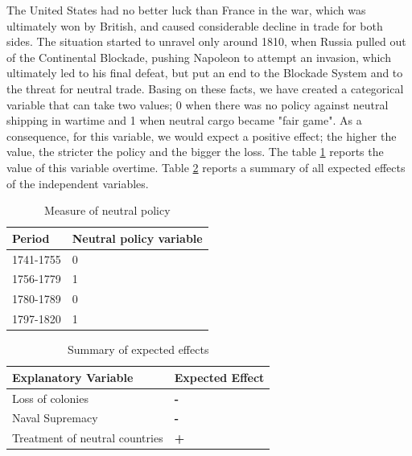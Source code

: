 \documentclass[12pt,a4paper,notitlepage,english]{article}
\begin{document}
The United States had no better luck than France in the war, which was ultimately won by British, and caused considerable decline in trade for both sides.
The situation started to unravel only around 1810, when Russia pulled out of the Continental Blockade, pushing Napoleon to attempt an invasion, which ultimately led to his final defeat, but put an end to the Blockade System and to the threat for neutral trade.
Basing on these facts, we have created a categorical variable that can take two values; 0 when there was no policy against neutral shipping in wartime and 1 when neutral cargo became "fair game". 
As a consequence, for this variable, we would expect a positive effect; the higher the value, the stricter the policy and the bigger the loss.
The table \ref{neutral_policy} reports the value of this variable overtime.
Table \ref{summary} reports a summary of all expected effects of the independent variables.


\begin{table}[H]
\centering
\caption{Measure of neutral policy}
\label{neutral_policy}
\begin{tabular}{ll}
\hline \hline
Period & Neutral policy variable  \\ \hline
1741-1755 & 0                  \\
1756-1779 & 1       \\
1780-1789 & 0                 \\
1797-1820 & 1                 \\
\hline 
\end{tabular}
\end{table}

\begin{table}[H]
\centering
\caption{Summary of expected effects}
\label{summary}
\begin{tabular}{ll}
\hline \hline
Explanatory Variable & Expected Effect  \\ \hline
Loss of colonies & \textbf{-}                  \\
Naval Supremacy & \textbf{-}                 \\
Treatment of neutral countries &       \textbf{+}      \\ \hline 
\end{tabular}
\end{table}
\end{document}
